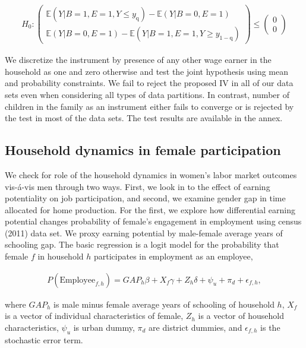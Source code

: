 \begin{linenomath*}\begin{align}
		H_{0}:  \begin{pmatrix}
			\mathbb{E}(Y|B=1, E=1, Y\leq y_{\text{q}}) - \mathbb{E}(Y|B=0, E=1)  \\
			\mathbb{E}(Y|B=0, E=1) - \mathbb{E}(Y|B=1, E=1, Y\geq y_{1-\text{q}})  
		\end{pmatrix} \leq \begin{pmatrix} 0\\0\end{pmatrix}
\end{align}\end{linenomath*}  
We discretize the instrument by presence of any other wage earner in the household as one and zero otherwise and test the joint hypothesis using mean and probability constraints. We fail to reject the proposed IV in all of our data sets even when considering all types of data partitions. In contrast, number of children in the family as an instrument either fails to converge or is rejected by the test in most of the data sets. The test results are available in the annex.\par  

\subsection{Household dynamics in female participation}

We check for role of the household dynamics in women's labor market outcomes vis-\'{a}-vis men through two ways. First, we look in to the effect of earning potentiality on job participation, and second, we examine gender gap in time allocated for home production. For the first, we explore how differential earning potential changes probability of female's engagement in employment using census (2011) data set. We proxy earning potential by male-female average years of schooling gap. The basic regression is a logit model for the probability that female $f$ in household $h$ participates in employment as an employee, 
\begin{linenomath*}\begin{align}
	P(\text{Employee}_{f, h}) = GAP_{h}\beta+ X_{f}\gamma+ Z_{h}\delta+ \psi_{u} + \pi_{d} + \epsilon_{f,h}, \label{eqn:earningPotRegEqn}
	\end{align}\end{linenomath*} 
where $GAP_{h}$ is male minus female average years of schooling of household $h$, $X_{f}$ is a vector of individual characteristics of female, $Z_{h}$ is a vector of household characteristics, $\psi_{u}$ is urban dummy, $\pi_{d}$ are district dummies, and $\epsilon_{f,h}$ is the stochastic error term.\par


